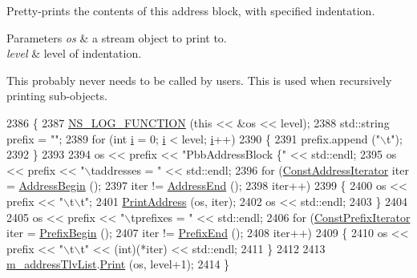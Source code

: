 Pretty-\/prints the contents of this address block, with specified indentation. 


\begin{DoxyParams}{Parameters}
{\em os} & a stream object to print to. \\
\hline
{\em level} & level of indentation.\\
\hline
\end{DoxyParams}
This probably never needs to be called by users. This is used when recursively printing sub-\/objects. 
\begin{DoxyCode}
2386 \{
2387   \hyperlink{log-macros-disabled_8h_a90b90d5bad1f39cb1b64923ea94c0761}{NS\_LOG\_FUNCTION} (\textcolor{keyword}{this} << &os << level);
2388   std::string prefix = \textcolor{stringliteral}{""};
2389   \textcolor{keywordflow}{for} (\textcolor{keywordtype}{int} \hyperlink{bernuolliDistribution_8m_a6f6ccfcf58b31cb6412107d9d5281426}{i} = 0; \hyperlink{bernuolliDistribution_8m_a6f6ccfcf58b31cb6412107d9d5281426}{i} < level; \hyperlink{bernuolliDistribution_8m_a6f6ccfcf58b31cb6412107d9d5281426}{i}++)
2390     \{
2391       prefix.append (\textcolor{stringliteral}{"\(\backslash\)t"});
2392     \}
2393 
2394   os << prefix << \textcolor{stringliteral}{"PbbAddressBlock \{"} << std::endl;
2395   os << prefix << \textcolor{stringliteral}{"\(\backslash\)taddresses = "} << std::endl;
2396   \textcolor{keywordflow}{for} (\hyperlink{classns3_1_1PbbAddressBlock_ac1f10df8f85c0c8d4b729352bc32a7cf}{ConstAddressIterator} iter = \hyperlink{classns3_1_1PbbAddressBlock_a3eb4e97961cf32ffc66692ed2e9e8774}{AddressBegin} ();
2397        iter != \hyperlink{classns3_1_1PbbAddressBlock_acf5ebced174e6605bff8cb3a439a81ae}{AddressEnd} ();
2398        iter++)
2399     \{
2400       os << prefix << \textcolor{stringliteral}{"\(\backslash\)t\(\backslash\)t"};
2401       \hyperlink{classns3_1_1PbbAddressBlock_a46d232de8e7db3ba865947c49cb703d1}{PrintAddress} (os, iter);
2402       os << std::endl;
2403     \}
2404 
2405   os << prefix << \textcolor{stringliteral}{"\(\backslash\)tprefixes = "} << std::endl;
2406   \textcolor{keywordflow}{for} (\hyperlink{classns3_1_1PbbAddressBlock_ac99d39169c106574b8c2aa51646bf404}{ConstPrefixIterator} iter = \hyperlink{classns3_1_1PbbAddressBlock_a25bc50d9f7ba1a17821a0907ac7ba352}{PrefixBegin} ();
2407        iter != \hyperlink{classns3_1_1PbbAddressBlock_a10027797f34518ea3921a610011fc9d7}{PrefixEnd} ();
2408        iter++)
2409     \{
2410       os << prefix << \textcolor{stringliteral}{"\(\backslash\)t\(\backslash\)t"} << (int)(*iter) << std::endl;
2411     \}
2412 
2413   \hyperlink{classns3_1_1PbbAddressBlock_aee976005ebb4d8ebeaec3e155d4800f1}{m\_addressTlvList}.\hyperlink{classns3_1_1PbbAddressTlvBlock_ad864181947f00f1fe5a5292d18d964bf}{Print} (os, level+1);
2414 \}
\end{DoxyCode}
